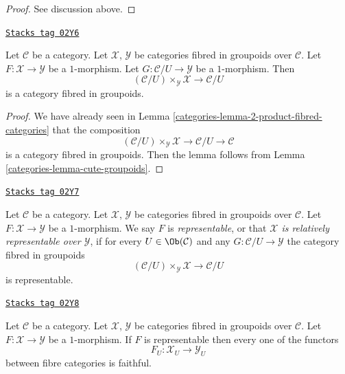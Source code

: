 \begin{proof}
See discussion above.
\end{proof}

\begin{lemma}
\label{categories-lemma-prepare-representable-map-stack-in-groupoids}
\href{https://stacks.math.columbia.edu/tag/02Y6}{\texttt{Stacks tag 02Y6}}

Let $\mathcal{C}$ be a category.
Let $\mathcal{X}$, $\mathcal{Y}$ be categories fibred in groupoids
over $\mathcal{C}$.
Let $F : \mathcal{X} \to \mathcal{Y}$ be a $1$-morphism.
Let $G : \mathcal{C}/U \to \mathcal{Y}$ be a $1$-morphism.
Then
$$
(\mathcal{C}/U) \times_\mathcal{Y} \mathcal{X}
\longrightarrow
\mathcal{C}/U
$$
is a category fibred in groupoids.
\end{lemma}

\begin{proof}

We have already seen in Lemma \ref{categories-lemma-2-product-fibred-categories}
that the composition
$$
(\mathcal{C}/U) \times_\mathcal{Y} \mathcal{X}
\longrightarrow
\mathcal{C}/U
\longrightarrow
\mathcal{C}
$$
is a category fibred in groupoids. Then the lemma follows from
Lemma \ref{categories-lemma-cute-groupoids}.
\end{proof}

\begin{definition}
\label{categories-definition-representable-map-categories-fibred-in-groupoids}
\href{https://stacks.math.columbia.edu/tag/02Y7}{\texttt{Stacks tag 02Y7}}

Let $\mathcal{C}$ be a category.
Let $\mathcal{X}$, $\mathcal{Y}$ be categories fibred in groupoids
over $\mathcal{C}$.
Let $F : \mathcal{X} \to \mathcal{Y}$ be a $1$-morphism.
We say $F$ is {\it representable}, or that
{\it $\mathcal{X}$ is relatively representable over $\mathcal{Y}$},
if for every $U \in \Ob(\mathcal{C})$
and any $G : \mathcal{C}/U \to \mathcal{Y}$
the category fibred in groupoids
$$
(\mathcal{C}/U) \times_\mathcal{Y} \mathcal{X}
\longrightarrow
\mathcal{C}/U
$$
is representable.
\end{definition}

\begin{lemma}
\label{categories-lemma-spell-out-representable-map-stack-in-groupoids}
\href{https://stacks.math.columbia.edu/tag/02Y8}{\texttt{Stacks tag 02Y8}}

Let $\mathcal{C}$ be a category.
Let $\mathcal{X}$, $\mathcal{Y}$ be categories fibred in groupoids
over $\mathcal{C}$.
Let $F : \mathcal{X} \to \mathcal{Y}$ be a $1$-morphism.
If $F$ is representable then every one of the functors
$$
F_U : \mathcal{X}_U \longrightarrow \mathcal{Y}_U
$$
between fibre categories is faithful.
\end{lemma}

